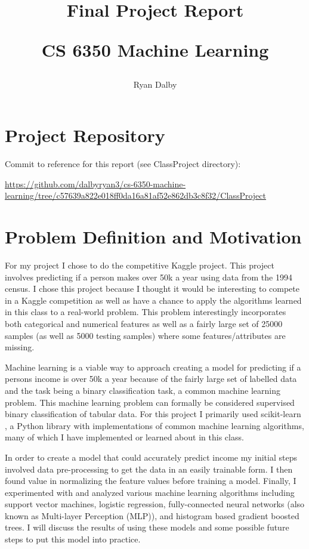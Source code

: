 \documentclass[11pt]{article}
\title{
    Final Project Report

    \large{
    CS 6350 Machine Learning
    }  
    
}
\author{
    Ryan Dalby
}
\date{\displaydate{date}}
\begin{document}
\maketitle

\section*{Project Repository}
Commit to reference for this report (see ClassProject directory): 

\begin{sloppypar}
    \url{https://github.com/dalbyryan3/cs-6350-machine-learning/tree/c57639a822e018ff0da16a81af52e862db3c8f32/ClassProject}
\end{sloppypar}

\section*{Problem Definition and Motivation}

For my project I chose to do the competitive Kaggle project.
This project involves predicting if a person makes over 50k a year using data from the 1994 census. 
I chose this project because I thought it would be interesting to compete in a Kaggle competition as well as have a chance to apply the algorithms learned in this class to a real-world problem.
This problem interestingly incorporates both categorical and numerical features as well as a fairly large set of 25000 samples (as well as 5000 testing samples) where some features/attributes are missing.

Machine learning is a viable way to approach creating a model for predicting if a persons income is over 50k a year because of the fairly large set of labelled data and the task being a binary classification task, a common machine learning problem.
This machine learning problem can formally be considered supervised binary classification of tabular data. 
For this project I primarily used scikit-learn \cite{noauthor_scikit-learn_nodate}, a Python library with implementations of common machine learning algorithms, many of which I have implemented or learned about in this class.

In order to create a model that could accurately predict income my initial steps involved data pre-processing to get the data in an easily trainable form.
I then found value in normalizing the feature values before training a model.
Finally, I experimented with and analyzed various machine learning algorithms including support vector machines, logistic regression, fully-connected neural networks (also known as Multi-layer Perception (MLP)), and histogram based gradient boosted trees.
I will discuss the results of using these models and some possible future steps to put this model into practice.
\end{document}
